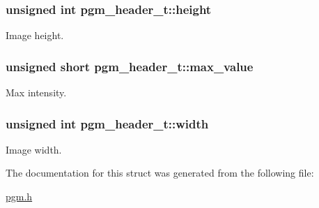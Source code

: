 \subsubsection[{height}]{\setlength{\rightskip}{0pt plus 5cm}unsigned int pgm\+\_\+header\+\_\+t\+::height}\label{structpgm__header__t_ab5277a5040e388eb35e9e99c3c986b93}
Image height. \hypertarget{structpgm__header__t_adbfbe5c1f5a224b0709248e4f8f4441a}{}
\subsubsection[{max\+\_\+value}]{\setlength{\rightskip}{0pt plus 5cm}unsigned short pgm\+\_\+header\+\_\+t\+::max\+\_\+value}\label{structpgm__header__t_adbfbe5c1f5a224b0709248e4f8f4441a}
Max intensity. \hypertarget{structpgm__header__t_a3b5d619d3a7a2ace9dd3c3f4f5ab7204}{}
\subsubsection[{width}]{\setlength{\rightskip}{0pt plus 5cm}unsigned int pgm\+\_\+header\+\_\+t\+::width}\label{structpgm__header__t_a3b5d619d3a7a2ace9dd3c3f4f5ab7204}
Image width. 

The documentation for this struct was generated from the following file\+:\begin{DoxyCompactItemize}
\item 
\hyperlink{pgm_8h}{pgm.\+h}\end{DoxyCompactItemize}
